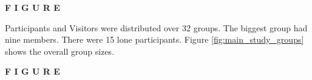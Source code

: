 \textbf{F I G U R E}

Participants and Visitors were distributed over 32 groups. The biggest group had nine members. There were 15 lone participants. Figure \ref{fig:main_study_groups} shows the overall group sizes.

\textbf{F I G U R E}

